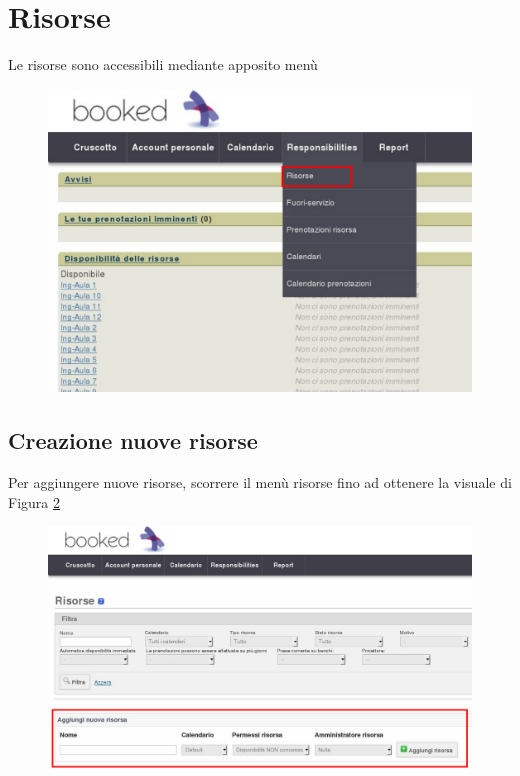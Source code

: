 \section{Risorse}
Le risorse sono accessibili mediante apposito menù
\begin{figure}[H]
\centering{}\includegraphics[scale=0.5]{Immagini/amministratore_menu_generale_selezione_risorse.pdf}
\normalsize
\caption{}
\label{fig:amministratore_menu_generale_selezione_risorse.pdf}
\end{figure}

\subsection{Creazione nuove risorse}
Per aggiungere nuove risorse, scorrere il menù risorse fino ad ottenere la visuale di
Figura \ref{fig:risorse_vista_generale_creazione.pdf}
\begin{figure}[H]
\centering{}\includegraphics[scale=0.5]{Immagini/risorse_vista_generale_creazione.pdf}
\normalsize
\caption{}
\label{fig:risorse_vista_generale_creazione.pdf}
\end{figure}

